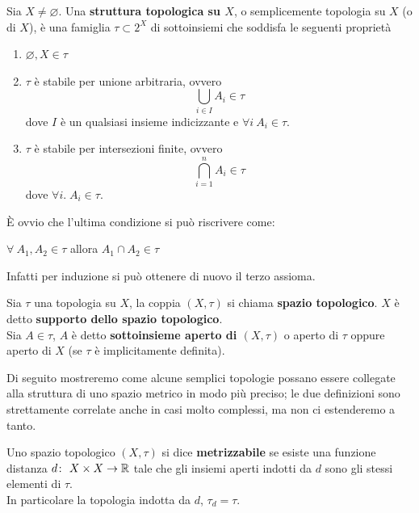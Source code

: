 \begin{definition}
	Sia $X \neq \varnothing$. Una \textbf{struttura topologica su $X$}, o semplicemente topologia su $X$ (o di $X$), è una famiglia $\tau\subset 2^X$ di sottoinsiemi  che soddisfa le seguenti proprietà
	\begin{enumerate}
		\item $\varnothing, X \in \tau$
		\item $\tau$ è stabile per unione arbitraria, ovvero 
		\begin{equation*}
			\bigcup_{i \in I} A_i \in \tau 	
		\end{equation*}
		dove $I$ è un qualsiasi insieme indicizzante e $\forall i \  A_i \in \tau$.
		\item $\tau$ è stabile per intersezioni finite, ovvero 
		\begin{equation*}
			\bigcap^n_{i=1} A_i \in \tau
		\end{equation*}
		dove $\forall i. \; A_i \in \tau$.
	\end{enumerate} 
\end{definition}

\begin{remark}
	È ovvio che l'ultima condizione si può riscrivere come: 
	\begin{center}
		$\forall \ A_1, A_2 \in \tau$ allora $A_1 \cap A_2 \in \tau$ 
	\end{center}
	Infatti per induzione si può ottenere di nuovo il terzo assioma. 
\end{remark}

\begin{definition}
	Sia $\tau$ una topologia su $X$, la coppia $(X, \tau)$ si chiama \textbf{spazio topologico}. $X$ è detto \textbf{supporto dello spazio topologico}. \\ Sia $A \in \tau$, $A$ è detto \textbf{sottoinsieme aperto di $(X,\tau)$} o aperto di $\tau$ oppure aperto di $X$ (se $\tau$ è implicitamente definita). 	
\end{definition}


Di seguito mostreremo come alcune semplici topologie possano essere collegate alla struttura di uno spazio metrico in modo più preciso; le due definizioni sono strettamente correlate anche in casi molto complessi, ma non ci estenderemo a tanto.

\begin{definition}
	Uno spazio topologico $(X,\tau)$ si dice \textbf{metrizzabile} se esiste una funzione distanza $d \colon\ X\times X \rightarrow \mathbb{R}$ tale che gli insiemi aperti indotti da $d$ sono gli stessi elementi di $\tau$. \\ In particolare la topologia indotta da $d$, $\tau_d  = \tau$. 
\end{definition}

